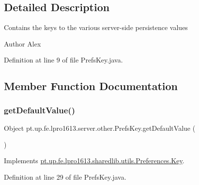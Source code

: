 \subsection{Detailed Description}
Contains the keys to the various server-\/side persistence values \begin{DoxyAuthor}{Author}
Alex 
\end{DoxyAuthor}


Definition at line 9 of file Prefs\+Key.\+java.



\subsection{Member Function Documentation}
\hypertarget{enumpt_1_1up_1_1fe_1_1lpro1613_1_1server_1_1other_1_1_prefs_key_ab8700091048a80f746647cebab8a1876}{}\label{enumpt_1_1up_1_1fe_1_1lpro1613_1_1server_1_1other_1_1_prefs_key_ab8700091048a80f746647cebab8a1876} 
\subsubsection{\texorpdfstring{get\+Default\+Value()}{getDefaultValue()}}
{\footnotesize\ttfamily Object pt.\+up.\+fe.\+lpro1613.\+server.\+other.\+Prefs\+Key.\+get\+Default\+Value (\begin{DoxyParamCaption}{ }\end{DoxyParamCaption})}



Implements \hyperlink{interfacept_1_1up_1_1fe_1_1lpro1613_1_1sharedlib_1_1utils_1_1_preferences_1_1_key_aa78c759626a4e04578befd149e4c7310}{pt.\+up.\+fe.\+lpro1613.\+sharedlib.\+utils.\+Preferences.\+Key}.



Definition at line 29 of file Prefs\+Key.\+java.

\hypertarget{enumpt_1_1up_1_1fe_1_1lpro1613_1_1server_1_1other_1_1_prefs_key_ab78cc090bf215b90b4387473ae17524a}{}\label{enumpt_1_1up_1_1fe_1_1lpro1613_1_1server_1_1other_1_1_prefs_key_ab78cc090bf215b90b4387473ae17524a} 
